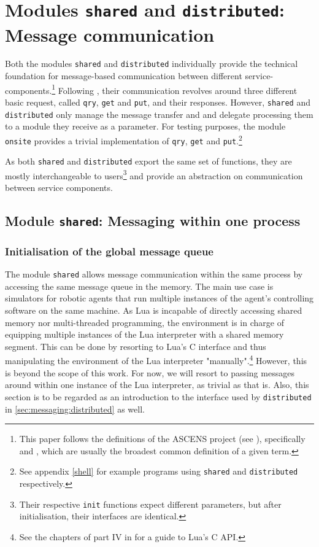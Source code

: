 \chapter{Modules \texttt{shared} and \texttt{distributed}: Message communication}

Both the modules \texttt{shared} and \texttt{distributed} individually provide the technical foundation for message-based communication between different service-components.\footnote{This paper follows the definitions of the ASCENS project (see \cite{ASCENS}), specifically \cite{AscensD41} and \cite{HoelzlWirsing2011}, which are usually the broadest common definition of a given term.} Following \cite{AscensD11}, their communication revolves around three different basic request, called \texttt{qry}, \texttt{get} and \texttt{put}, and their responses. However, \texttt{shared} and \texttt{distributed} only manage the message transfer and and delegate processing them to a module they receive as  a parameter. For testing purposes, the module \texttt{onsite} provides a trivial implementation of \texttt{qry}, \texttt{get} and \texttt{put}.\footnote{See appendix \ref{shell} for example programs using \texttt{shared} and \texttt{distributed} respectively.}

As both \texttt{shared} and \texttt{distributed} export the same set of functions, they are mostly interchangeable to users\footnote{Their respective \texttt{init} functions expect different parameters, but after initialisation, their interfaces are identical.} and provide an abstraction on communication between service components.

\section{Module \texttt{shared}: Messaging within one process}
\label{sec:messages:distributed}

\subsection{Initialisation of the global message queue}

The module \texttt{shared} allows message communication within the same process by accessing the same message queue in the memory. The main use case is simulators for robotic agents that run multiple instances of the agent's controlling software on the same machine. As Lua is incapable of directly accessing shared memory nor multi-threaded programming, the environment is in charge of equipping multiple instances of the Lua interpreter with a shared memory segment. This can be done by resorting to Lua's C interface and thus manipulating the environment of the Lua interpreter "manually".\footnote{See the chapters of part IV in \cite{Ierusalimschy2006} for a guide to Lua's C API.} However, this is beyond the scope of this work. For now, we will resort to passing messages around within one instance of the Lua interpreter, as trivial as that is. Also, this section is to be regarded as an introduction to the interface used by \texttt{distributed} in \ref{sec:messaging:distributed} as well.

